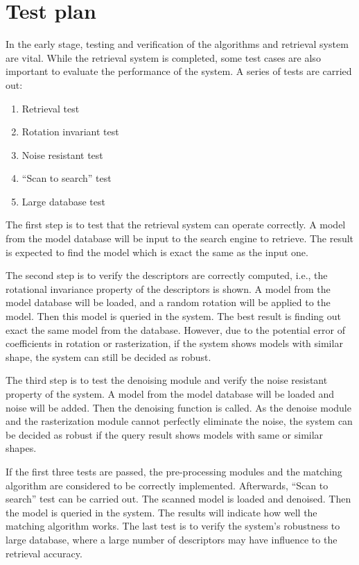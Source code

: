 \section{Test plan} \label{sec:test}

In the early stage, testing and verification of the algorithms and retrieval system are vital. While the retrieval system is completed, some test cases are also important to evaluate the performance of the system. A series of tests are carried out:

\begin{enumerate}[1.]
\item Retrieval test
\item Rotation invariant test
\item Noise resistant test
\item ``Scan to search'' test
\item Large database test
\end{enumerate}

The first step is to test that the retrieval system can operate correctly. A model from the model database will be input to the search engine to retrieve. The result is expected to find the model which is exact the same as the input one. 

The second step is to verify the descriptors are correctly computed, i.e., the rotational invariance property of the descriptors is shown. A model from the model database will be loaded, and a random rotation will be applied to the model. Then this model is queried in the system. The best result is finding out exact the same model from the database. However, due to the potential error of coefficients in rotation or rasterization, if the system shows models with similar shape, the system can still be decided as robust. 

The third step is to test the denoising module and verify the noise resistant property of the system. A model from the model database will be loaded and noise will be added. Then the denoising function is called. As the denoise module and the rasterization module cannot perfectly eliminate the noise, the system can be decided as robust if the query result shows models with same or similar shapes. 

If the first three tests are passed, the pre-processing modules and the matching algorithm are considered to be correctly implemented. Afterwards, ``Scan to search'' test can be carried out. The scanned model is loaded and denoised. Then the model is queried in the system. The results will indicate how well the matching algorithm works. The last test is to verify the system's robustness to large database, where a large number of descriptors may have influence to the retrieval accuracy. 


